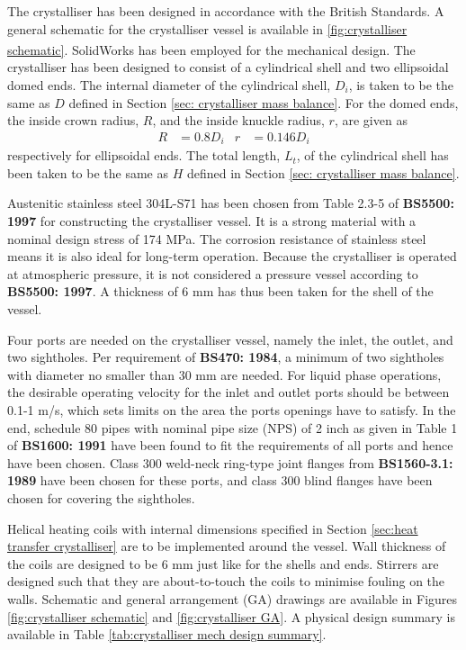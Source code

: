 The crystalliser has been designed in accordance with the British Standards. A general schematic for the crystalliser vessel is available in \cref{fig:crystalliser schematic}.  SolidWorks\textsuperscript{\textregistered} has been employed for the mechanical design. The crystalliser has been designed to consist of a cylindrical shell and two ellipsoidal domed ends. The internal diameter of the cylindrical shell, $D_i$, is taken to be the same as $D$ defined in Section \ref{sec: crystalliser mass balance}. For the domed ends, the inside crown radius, $R$, and the inside knuckle radius, $r$, are given as 
\begin{align}
    R &= 0.8 D_i &
    r &= 0.146 D_i
\end{align}
respectively for ellipsoidal ends. The total length, $L_t$, of the cylindrical shell has been taken to be the same as $H$ defined in Section \ref{sec: crystalliser mass balance}. 

Austenitic stainless steel 304L-S71 has been chosen from Table 2.3-5 of \textbf{BS5500: 1997} for constructing the crystalliser vessel. It is a strong material with a nominal design stress of 174 MPa. The corrosion resistance of stainless steel means it is also ideal for long-term operation. Because the crystalliser is operated at atmospheric pressure, it is not considered a pressure vessel according to \textbf{BS5500: 1997}. A thickness of 6 mm has thus been taken for the shell of the vessel.

Four ports are needed on the crystalliser vessel, namely the inlet, the outlet, and two sightholes. Per requirement of \textbf{BS470: 1984}, a minimum of two sightholes with diameter no smaller than 30 mm are needed. For liquid phase operations, the desirable operating velocity for the inlet and outlet ports should be between 0.1-1 m/s, which sets limits on the area the ports openings have to satisfy. In the end, schedule 80 pipes with nominal pipe size (NPS) of 2 inch as given in Table 1 of \textbf{BS1600: 1991} have been found to fit the requirements of all ports and hence have been chosen. Class 300 weld-neck ring-type joint flanges from \textbf{BS1560-3.1: 1989} have been chosen for these ports, and class 300 blind flanges have been chosen for covering the sightholes. 

Helical heating coils with internal dimensions specified in Section \ref{sec:heat transfer crystalliser} are to be implemented around the vessel. Wall thickness of the coils are designed to be 6 mm just like for the shells and ends. Stirrers are designed such that they are about-to-touch the coils to minimise fouling on the walls. Schematic and general arrangement (GA) drawings are available in Figures \ref{fig:crystalliser schematic} and \ref{fig:crystalliser GA}. A physical design summary is available in Table \ref{tab:crystalliser mech design summary}. 

